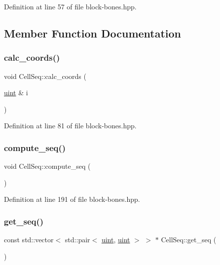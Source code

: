 Definition at line 57 of file block-\/bones.\+hpp.



\subsection{Member Function Documentation}
\mbox{\label{class_cell_seq_afce7ba75badccac90475c853368424ad}} 
\subsubsection{\texorpdfstring{calc\+\_\+coords()}{calc\_coords()}}
{\footnotesize\ttfamily void Cell\+Seq\+::calc\+\_\+coords (\begin{DoxyParamCaption}\item[{\hyperlink{typedefs_8hpp_a91ad9478d81a7aaf2593e8d9c3d06a14}{uint} \&}]{i }\end{DoxyParamCaption})\hspace{0.3cm}{\ttfamily [inline]}}



Definition at line 81 of file block-\/bones.\+hpp.

\mbox{\label{class_cell_seq_a6588fe1ad4e37f7a845386eca46c13c2}} 
\subsubsection{\texorpdfstring{compute\+\_\+seq()}{compute\_seq()}}
{\footnotesize\ttfamily void Cell\+Seq\+::compute\+\_\+seq (\begin{DoxyParamCaption}{ }\end{DoxyParamCaption})\hspace{0.3cm}{\ttfamily [inline]}}



Definition at line 191 of file block-\/bones.\+hpp.

\mbox{\label{class_cell_seq_a12235ff9c4a0183ed477679b61c4a19a}} 
\subsubsection{\texorpdfstring{get\+\_\+seq()}{get\_seq()}}
{\footnotesize\ttfamily const std\+::vector$<$ std\+::pair$<$ \hyperlink{typedefs_8hpp_a91ad9478d81a7aaf2593e8d9c3d06a14}{uint}, \hyperlink{typedefs_8hpp_a91ad9478d81a7aaf2593e8d9c3d06a14}{uint} $>$ $>$ $\ast$ Cell\+Seq\+::get\+\_\+seq (\begin{DoxyParamCaption}{ }\end{DoxyParamCaption})\hspace{0.3cm}{\ttfamily [inline]}}



